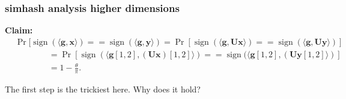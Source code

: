 \documentclass[compress]{beamer}
\newcommand{\bv}[1]{\mathbf{#1}}
\DeclareMathOperator{\sign}{sign}
\begin{document}
\begin{frame}[t]
	\frametitle{simhash analysis higher dimensions}
\textbf{Claim:} 
\begin{align*}
	&\Pr[\sign(\langle \bv{g}, \bv{x} \rangle) == \sign(\langle \bv{g}, \bv{y} \rangle) = \Pr[\sign(\langle \bv{g}, \bv{U}\bv{x} \rangle) == \sign(\langle \bv{g}, \bv{U}\bv{y} \rangle)] \\
	&\hspace{4em}= \Pr[\sign(\langle \bv{g}[1,2], (\bv{U}\bv{x})[1,2] \rangle) == \sign(\langle \bv{g}[1,2], (\bv{U}\bv{y}[1,2] \rangle)]\\
	&\hspace{4em} = 1 - \frac{\theta}{\pi}.
	\end{align*}

	The first step is the trickiest here. Why does it hold?
\end{frame}


	
\end{document}

